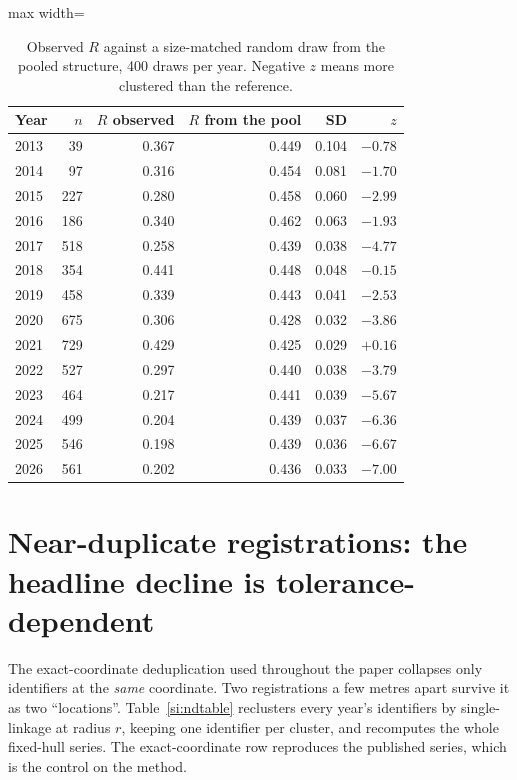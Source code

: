 \documentclass[fleqn,10pt]{wlpeerj}
\begin{document}
\begin{table}[H]
\centering
\caption{Observed $R$ against a size-matched random draw from the pooled structure, 400 draws per year. Negative $z$ means more clustered than the reference.}
\label{si:pooled}
\small
\begin{adjustbox}{max width=\linewidth}
\begin{tabular}{lrrrrr}
\toprule
Year & $n$ & $R$ observed & $R$ from the pool & SD & $z$ \\
\midrule
2013 & 39 & 0.367 & 0.449 & 0.104 & $-0.78$ \\
2014 & 97 & 0.316 & 0.454 & 0.081 & $-1.70$ \\
2015 & 227 & 0.280 & 0.458 & 0.060 & $-2.99$ \\
2016 & 186 & 0.340 & 0.462 & 0.063 & $-1.93$ \\
2017 & 518 & 0.258 & 0.439 & 0.038 & $-4.77$ \\
2018 & 354 & 0.441 & 0.448 & 0.048 & $-0.15$ \\
2019 & 458 & 0.339 & 0.443 & 0.041 & $-2.53$ \\
2020 & 675 & 0.306 & 0.428 & 0.032 & $-3.86$ \\
2021 & 729 & 0.429 & 0.425 & 0.029 & $+0.16$ \\
2022 & 527 & 0.297 & 0.440 & 0.038 & $-3.79$ \\
2023 & 464 & 0.217 & 0.441 & 0.039 & $-5.67$ \\
2024 & 499 & 0.204 & 0.439 & 0.037 & $-6.36$ \\
2025 & 546 & 0.198 & 0.439 & 0.036 & $-6.67$ \\
2026 & 561 & 0.202 & 0.436 & 0.033 & $-7.00$ \\
\bottomrule
\end{tabular}
\end{adjustbox}
\end{table}

\section{Near-duplicate registrations: the headline decline is tolerance-dependent}
\label{si:neardupsect}

The exact-coordinate deduplication used throughout the paper collapses only identifiers at the
\emph{same} coordinate. Two registrations a few metres apart survive it as two ``locations''.
Table~\ref{si:ndtable} reclusters every year's identifiers by single-linkage at radius $r$,
keeping one identifier per cluster, and recomputes the whole fixed-hull series. The
exact-coordinate row reproduces the published series, which is the control on the method.
\end{document}

